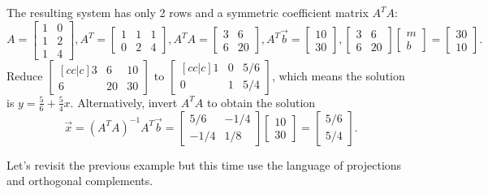 \begin{example}
The resulting system has only 2 rows and a symmetric coefficient matrix $A^TA$:
$$A = \begin{bmatrix}1&0\\1&2\\1&4\end{bmatrix}, 
A^T = \begin{bmatrix}1&1&1\\0&2&4\end{bmatrix}, 
A^T A = \begin{bmatrix}3&6\\6&20\end{bmatrix}, 
A^T\vec b = \begin{bmatrix}10\\30\end{bmatrix}, \begin{bmatrix}3&6\\6&20\end{bmatrix} \begin{bmatrix}m\\b\end{bmatrix}=\begin{bmatrix}30\\10\end{bmatrix}.$$ 
Reduce $\begin{bmatrix}[cc|c]3&6&10\\6&20&30\end{bmatrix}$ to $\begin{bmatrix}[cc|c]1&0&5/6\\0&1&5/4\end{bmatrix}$, which means the solution is $y=\frac{5}{6}+\frac{5}{4}x.$  Alternatively, invert $A^TA$ to obtain the solution $$\vec x = (A^T A)^{-1}A^T \vec b = \begin{bmatrix}5/6&-1/4\\-1/4&1/8\end{bmatrix}\begin{bmatrix}10\\30\end{bmatrix} = \begin{bmatrix}5/6\\5/4\end{bmatrix}.$$  

\end{example} 

Let's revisit the previous example but this time use the language of projections and orthogonal complements.

